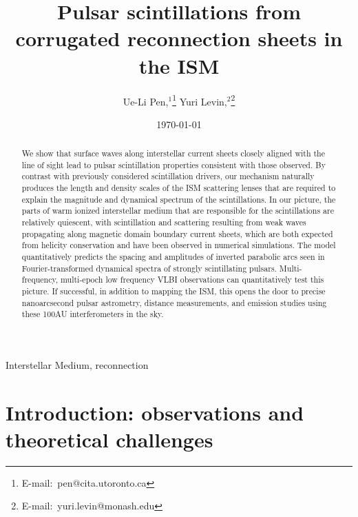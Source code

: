 \documentclass[useAMS,usenatbib]{mn2e}
\title[Interstellar Plasma Scattering]{
Pulsar scintillations from corrugated reconnection sheets in the ISM
}
\author[Pen and Levin]{Ue-Li
  Pen,$^{1}$\thanks{E-mail:\ pen@cita.utoronto.ca}
Yuri Levin,$^2$\thanks{E-mail:\ yuri.levin@monash.edu}
}
\begin{document}
\date{\today}

\pagerange{\pageref{firstpage}--\pageref{lastpage}} 

\maketitle
\label{firstpage}
\begin{abstract}

We show that surface waves along interstellar current sheets closely
aligned with the line of sight lead to pulsar scintillation properties
consistent with those observed.  By contrast with previously
considered scintillation drivers, our mechanism naturally produces the
length and density scales of the ISM scattering lenses that are
required to explain the magnitude and dynamical spectrum of the
scintillations.  In our picture, the parts of warm ionized
interstellar medium that are responsible for the scintillations are
relatively quiescent, with scintillation and scattering resulting from
weak waves propagating along magnetic domain boundary current sheets,
which are both expected from helicity conservation and have been
observed in numerical simulations.  The model quantitatively predicts
the spacing and amplitudes of inverted parabolic arcs seen in
Fourier-transformed dynamical spectra of strongly scintillating
pulsars. Multi-frequency, multi-epoch low frequency VLBI observations can
quantitatively test this picture.  If successful, in addition to
mapping the ISM, this opens the door to precise nanoarcsecond pulsar
astrometry, distance measurements, and emission studies using these
100AU interferometers in the sky. 

\end{abstract}
\begin{keywords}
Interstellar Medium, reconnection
\end{keywords}

\newcommand{\be}{\begin{eqnarray}}
\newcommand{\ee}{\end{eqnarray}}
\newcommand{\beq}{\begin{equation}}
\newcommand{\eeq}{\end{equation}}

\section{Introduction: observations and theoretical challenges}
\end{document}
